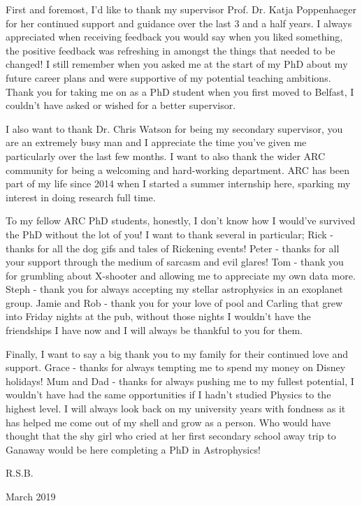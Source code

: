 \documentclass[
12pt, %
oneside, %
english, %
onehalfspacing, %
liststotoc, %
headsepline, %
]{MastersDoctoralThesis} %
\begin{document}
\begin{acknowledgements}
\addchaptertocentry{\acknowledgementname} %

First and foremost, I'd like to thank my supervisor Prof. Dr. Katja Poppenhaeger for her continued support and guidance over the last 3 and a half years. I always appreciated when receiving feedback you would say when you liked something, the positive feedback was refreshing in amongst the things that needed to be changed! I still remember when you asked me at the start of my PhD about my future career plans and were supportive of my potential teaching ambitions. Thank you for taking me on as a PhD student when you first moved to Belfast, I couldn't have asked or wished for a better supervisor.

I also want to thank Dr. Chris Watson for being my secondary supervisor, you are an extremely busy man and I appreciate the time you've given me particularly over the last few months. I want to also thank the wider ARC community for being a welcoming and hard-working department. ARC has been part of my life since 2014 when I started a summer internship here, sparking my interest in doing research full time.

To my fellow ARC PhD students, honestly, I don't know how I would've survived the PhD without the lot of you! I want to thank several in particular; Rick - thanks for all the dog gifs and tales of Rickening events! Peter - thanks for all your support through the medium of sarcasm and evil glares! Tom - thank you for grumbling about X-shooter and allowing me to appreciate my own data more. Steph - thank you for always accepting my stellar astrophysics in an exoplanet group. Jamie and Rob - thank you for your love of pool and Carling that grew into Friday nights at the pub, without those nights I wouldn't have the friendships I have now and I will always be thankful to you for them.

Finally, I want to say a big thank you to my family for their continued love and support. Grace - thanks for always tempting me to spend my money on Disney holidays! Mum and Dad - thanks for always pushing me to my fullest potential, I wouldn't have had the same opportunities if I hadn't studied Physics to the highest level. I will always look back on my university years with fondness as it has helped me come out of my shell and grow as a person. Who would have thought that the shy girl who cried at her first secondary school away trip to Ganaway would be here completing a PhD in Astrophysics!

\begin{flushright}
R.S.B.

March 2019
\end{flushright}

\end{acknowledgements}
\end{document}
